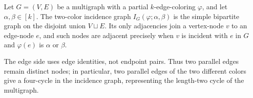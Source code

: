 \begin{definition}
Let $G=(V,E)$ be a multigraph with a partial $k$-edge-coloring $\varphi$,
and let $\alpha,\beta\in[k]$.  The two-color incidence graph
$I_G(\varphi;\alpha,\beta)$ is the simple bipartite graph on the disjoint
union $V\sqcup E$.  Its only adjacencies join a vertex-node $v$ to an
edge-node $e$, and such nodes are adjacent precisely when $v$ is incident
with $e$ in $G$ and $\varphi(e)$ is $\alpha$ or $\beta$.

The edge side uses edge identities, not endpoint pairs.  Thus two parallel
edges remain distinct nodes; in particular, two parallel edges of the two
different colors give a four-cycle in the incidence graph, representing the
length-two cycle of the multigraph.
\end{definition}

